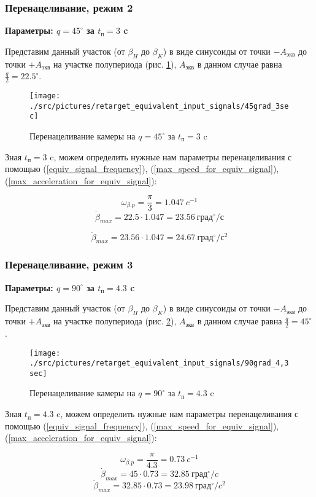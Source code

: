 \subsubsection{Перенацеливание, режим 2}

\textbf{Параметры: $q = 45^{\circ}$ за $t_{\text{п}} = 3$ c}

Представим данный участок (от $\beta_{H}$ до $\beta_{K}$) в виде синусоиды от
точки $-A_\text{экв}$ до точки $+A_\text{экв}$ на участке полупериода
(рис. \ref{retarget_45grad_3sec}), $A_\text{экв}$ в данном случае равна
$\frac{q}{2} = 22.5^{\circ}$.

\begin{figure}[h!]
    \centering
    \texttt{[image: ./src/pictures/retarget\_equivalent\_input\_signals/45grad\_3sec]}
    \caption{Перенацеливание камеры на $q = 45^{\circ}$ за $t_\text{п} = 3$ c}
    \label{retarget_45grad_3sec}
\end{figure}

Зная $t_{\text{п} } = 3$ c, можем определить нужные нам параметры перенацеливания
с помощью (\ref{equiv_signal_frequency}),
(\ref{max_speed_for_equiv_signal}),
(\ref{max_acceleration_for_equiv_signal}):

$$
    \omega_{\beta.p} = \frac{\pi}{3} = 1.047 ~c^{-1}
$$
$$
    \dot{\beta}_{max} = 22.5 \cdot 1.047 = 23.56 ~\text{град}^{\circ} / \text{с}
$$

$$
    \ddot{\beta}_{max} = 23.56 \cdot 1.047 = 24.67 ~\text{град}^{\circ} / \text{с}^{2}
$$

\subsubsection{Перенацеливание, режим 3}

\textbf{Параметры: $q = 90^{\circ}$ за $t_\text{п} = 4.3$ c}

Представим данный участок (от $\beta_{H}$ до $\beta_{K}$) в виде синусоиды от точки
$-A_\text{экв}$ до точки $+A_\text{экв}$ на участке полупериода
(рис. \ref{retarget_90grad_4,3sec}), $A_\text{экв}$ в данном случае
равна $\frac{q}{2} = 45^{\circ}$.

\begin{figure}[ht!]
    \centering
    \texttt{[image: ./src/pictures/retarget\_equivalent\_input\_signals/90grad\_4,3sec]}
    \caption{Перенацеливание камеры на $q = 90^{\circ}$ за $t_\text{п} = 4.3$ c}
    \label{retarget_90grad_4,3sec}
\end{figure}

Зная $t_{\text{п} } = 4.3$ c, можем определить нужные нам параметры перенацеливания
с помощью (\ref{equiv_signal_frequency}),
(\ref{max_speed_for_equiv_signal}),
(\ref{max_acceleration_for_equiv_signal}):

$$
    \omega_{\beta.p} = \frac{\pi}{4.3} = 0.73 ~c^{-1}
$$
$$
    \dot{\beta}_{max} = 45 \cdot 0.73 = 32.85 ~\text{град}^{\circ} / c
$$
$$
    \ddot{\beta}_{max} = 32.85 \cdot 0.73 = 23.98 ~\text{град}^{\circ} / c^{2}
$$

\endinput

